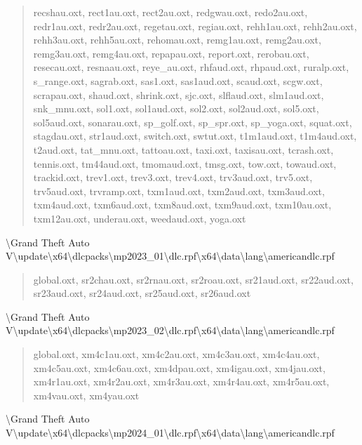 \documentclass[]{scrartcl}
\begin{document}
\begin{quote}
recshau.oxt, rect1au.oxt, rect2au.oxt, redgwau.oxt, redo2au.oxt, redr1au.oxt, redr2au.oxt, regetau.oxt, regiau.oxt, rehh1au.oxt, rehh2au.oxt, rehh3au.oxt, rehh5au.oxt, rehomau.oxt, remg1au.oxt, remg2au.oxt, remg3au.oxt, remg4au.oxt, repapau.oxt, report.oxt, rerobau.oxt, resecau.oxt, resnaau.oxt, reye\_au.oxt, rhfaud.oxt, rhpaud.oxt, ruralp.oxt, s\_range.oxt, sagrab.oxt, sas1.oxt, sas1aud.oxt, scaud.oxt, scgw.oxt, scrapau.oxt, shaud.oxt, shrink.oxt, sjc.oxt, slflaud.oxt, slm1aud.oxt, snk\_mnu.oxt, sol1.oxt, sol1aud.oxt, sol2.oxt, sol2aud.oxt, sol5.oxt, sol5aud.oxt, sonarau.oxt, sp\_golf.oxt, sp\_spr.oxt, sp\_yoga.oxt, squat.oxt, stagdau.oxt, str1aud.oxt, switch.oxt, swtut.oxt, t1m1aud.oxt, t1m4aud.oxt, t2aud.oxt, tat\_mnu.oxt, tattoau.oxt, taxi.oxt, taxisau.oxt, tcrash.oxt, tennis.oxt, tm44aud.oxt, tmomaud.oxt, tmsg.oxt, tow.oxt, towaud.oxt, trackid.oxt, trev1.oxt, trev3.oxt, trev4.oxt, trv3aud.oxt, trv5.oxt, trv5aud.oxt, trvramp.oxt, txm1aud.oxt, txm2aud.oxt, txm3aud.oxt, txm4aud.oxt, txm6aud.oxt, txm8aud.oxt, txm9aud.oxt, txm10au.oxt, txm12au.oxt, underau.oxt, weedaud.oxt, yoga.oxt
\end{quote}

\textbackslash{}Grand Theft Auto V\textbackslash{}update\textbackslash{}x64\textbackslash{}dlcpacks\textbackslash{}mp2023\_01\textbackslash{}dlc.rpf\textbackslash{}x64\textbackslash{}data\textbackslash{}lang\textbackslash{}americandlc.rpf

\begin{quote}
   \ttfamily
   global.oxt, sr2chau.oxt, sr2rnau.oxt, sr2roau.oxt, sr21aud.oxt, sr22aud.oxt, sr23aud.oxt, sr24aud.oxt, sr25aud.oxt, sr26aud.oxt
\end{quote}

\textbackslash{}Grand Theft Auto V\textbackslash{}update\textbackslash{}x64\textbackslash{}dlcpacks\textbackslash{}mp2023\_02\textbackslash{}dlc.rpf\textbackslash{}x64\textbackslash{}data\textbackslash{}lang\textbackslash{}americandlc.rpf

\begin{quote}
   \ttfamily
   global.oxt, xm4c1au.oxt, xm4c2au.oxt, xm4c3au.oxt, xm4c4au.oxt, xm4c5au.oxt, xm4c6au.oxt, xm4dpau.oxt, xm4igau.oxt, xm4jau.oxt, xm4r1au.oxt, xm4r2au.oxt, xm4r3au.oxt, xm4r4au.oxt, xm4r5au.oxt, xm4vau.oxt, xm4yau.oxt
\end{quote}

\textbackslash{}Grand Theft Auto V\textbackslash{}update\textbackslash{}x64\textbackslash{}dlcpacks\textbackslash{}mp2024\_01\textbackslash{}dlc.rpf\textbackslash{}x64\textbackslash{}data\textbackslash{}lang\textbackslash{}americandlc.rpf
\end{document}
